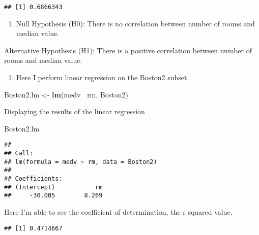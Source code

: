 \documentclass[]{article}
\newenvironment{Shaded}{\begin{snugshade}}{\end{snugshade}}
\newcommand{\KeywordTok}[1]{\textcolor[rgb]{0.13,0.29,0.53}{\textbf{#1}}}
\newcommand{\StringTok}[1]{\textcolor[rgb]{0.31,0.60,0.02}{#1}}
\newcommand{\OperatorTok}[1]{\textcolor[rgb]{0.81,0.36,0.00}{\textbf{#1}}}
\newcommand{\NormalTok}[1]{#1}
\providecommand{\tightlist}{%
  \setlength{\itemsep}{0pt}\setlength{\parskip}{0pt}}
\begin{document}
\begin{verbatim}
## [1] 0.6866343
\end{verbatim}

\begin{enumerate}
\def\labelenumi{\arabic{enumi})}
\setcounter{enumi}{4}
\tightlist
\item
  Null Hypothesis (H0): There is no correlation between number of rooms
  and median value.
\end{enumerate}

Alternative Hypothesis (H1): There is a positive correlation between
number of rooms and median value.

\begin{enumerate}
\def\labelenumi{\arabic{enumi})}
\setcounter{enumi}{5}
\tightlist
\item
  Here I perform linear regression on the Boston2 subset
\end{enumerate}

\begin{Shaded}
\begin{Highlighting}[]
\NormalTok{Boston2.lm <-}\StringTok{ }\KeywordTok{lm}\NormalTok{(medv}\OperatorTok{~}\StringTok{ }\NormalTok{rm, Boston2)}
\end{Highlighting}
\end{Shaded}

Displaying the results of the linear regression

\begin{Shaded}
\begin{Highlighting}[]
\NormalTok{Boston2.lm}
\end{Highlighting}
\end{Shaded}

\begin{verbatim}
## 
## Call:
## lm(formula = medv ~ rm, data = Boston2)
## 
## Coefficients:
## (Intercept)           rm  
##     -30.005        8.269
\end{verbatim}

Here I'm able to see the coefficient of determination, the r squared
value.

\begin{Shaded}
\end{Shaded}

\begin{verbatim}
## [1] 0.4714667
\end{verbatim}
\end{document}
